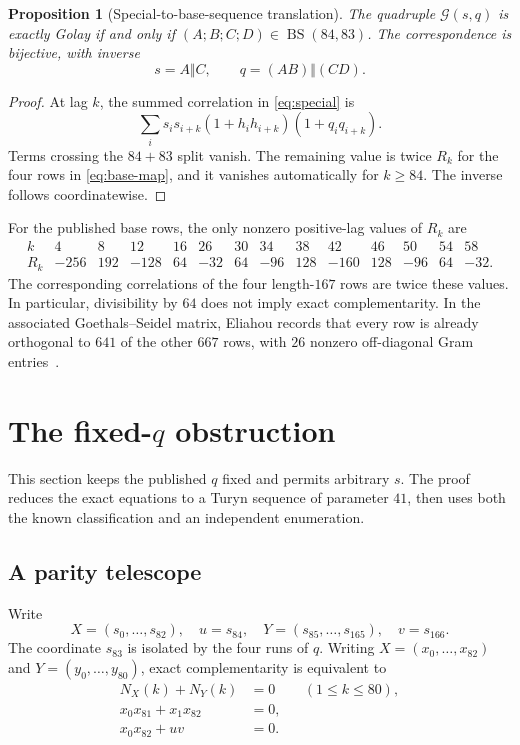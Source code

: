 \documentclass[11pt]{article}
\newtheorem{proposition}[theorem]{Proposition}
\theoremstyle{remark}
\newcommand{\BS}{\operatorname{BS}}
\begin{document}
\begin{proposition}[Special-to-base-sequence translation]
\label{prop:translation}
The quadruple $\mathcal G(s,q)$ is exactly Golay if and only if
$(A;B;C;D)\in\BS(84,83)$.  The correspondence is bijective, with inverse
\[
 s=A\Vert C,\qquad q=(AB)\Vert(CD).
\]
\end{proposition}

\begin{proof}
At lag $k$, the summed correlation in \eqref{eq:special} is
\[
 \sum_i s_is_{i+k}
 (1+h_ih_{i+k})(1+q_iq_{i+k}).
\]
Terms crossing the $84+83$ split vanish.  The remaining value is twice
$R_k$ for the four rows in \eqref{eq:base-map}, and it vanishes
automatically for $k\geq84$.  The inverse follows coordinatewise.
\end{proof}

For the published base rows, the only nonzero positive-lag values of $R_k$
are
\[
\begin{array}{c|rrrrrrrrrrrrr}
k&4&8&12&16&26&30&34&38&42&46&50&54&58\\ \hline
R_k&-256&192&-128&64&-32&64&-96&128&-160&128&-96&64&-32.
\end{array}                                                \tag{2.1}
\]
The corresponding correlations of the four length-$167$ rows are twice
these values.  In particular, divisibility by $64$ does not imply exact
complementarity.  In the associated Goethals--Seidel matrix, Eliahou
records that every row is already orthogonal to $641$ of the other $667$
rows, with $26$ nonzero off-diagonal Gram entries~\cite{eliahou-2025}.

\section{The fixed-\texorpdfstring{$q$}{q} obstruction}
\label{sec:fixedq}

This section keeps the published $q$ fixed and permits arbitrary $s$.
The proof reduces the exact equations to a Turyn sequence of parameter
$41$, then uses both the known classification and an independent
enumeration.

\subsection{A parity telescope}

Write
\[
 X=(s_0,\ldots,s_{82}),\quad u=s_{84},\quad
 Y=(s_{85},\ldots,s_{165}),\quad v=s_{166}.
\]
The coordinate $s_{83}$ is isolated by the four runs of $q$.  Writing
$X=(x_0,\ldots,x_{82})$ and $Y=(y_0,\ldots,y_{80})$, exact
complementarity is equivalent to
\begin{align}
 N_X(k)+N_Y(k)&=0 &&(1\leq k\leq80),       \label{eq:fixed-main}\\
 x_0x_{81}+x_1x_{82}&=0,                   \label{eq:fixed-81}\\
 x_0x_{82}+uv&=0.                          \label{eq:fixed-82}
\end{align}
\end{document}
